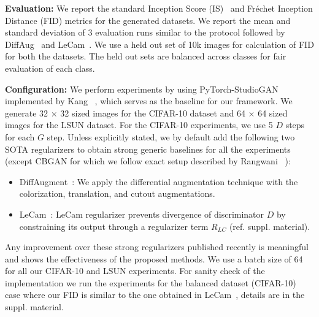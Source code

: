 \documentclass[runningheads,table]{llncs}
\begin{document}
\noindent\textbf{Evaluation: } We report the standard Inception Score (IS)~\cite{salimans2016improved} and Fr\'echet Inception Distance (FID) metrics for the generated datasets. We report the mean and standard deviation of 3 evaluation runs similar to the protocol followed by DiffAug~\cite{zhao2020differentiable} and LeCam~\cite{tseng2021regularizing}. We use a held out set of 10k images for calculation of FID for both the datasets. The held out sets are balanced across classes for fair evaluation of each class. 

\noindent\textbf{Configuration:} We perform experiments by using PyTorch-StudioGAN implemented  by Kang \etal~\cite{kang2020contrastive}, which serves as the baseline for our framework. We generate 32 $\times$ 32 sized images for the CIFAR-10 dataset and 64 $\times$ 64 sized images for the LSUN dataset. For the CIFAR-10 experiments, we use 5 $D$ steps for each $G$ step. Unless explicitly stated, we by default add the following two SOTA regularizers to obtain strong generic baselines for all the experiments (except CBGAN for which we follow exact setup described by Rangwani \etal~\cite{rangwani2021class}):
\begin{itemize}
\itemsep0em
    \item {DiffAugment~\cite{zhao2020differentiable}:} We apply the differential augmentation technique with the colorization, translation, and cutout augmentations.
    \item {LeCam~\cite{tseng2021regularizing}}: LeCam regularizer prevents divergence of discriminator $D$ by constraining its output through a regularizer term $R_{LC}$ (ref. suppl. material).
\end{itemize}
Any improvement over these strong regularizers published recently is meaningful and shows the effectiveness of the proposed methods. We use a batch size of 64 for all our CIFAR-10 and LSUN experiments. For sanity check of the implementation we run the experiments for the balanced dataset (CIFAR-10) case where our FID is similar to the one obtained in LeCam~\cite{tseng2021regularizing}, details are in the suppl. material.
\end{document}
